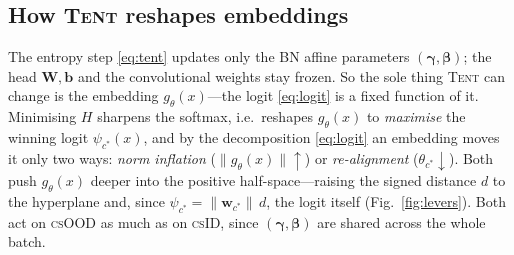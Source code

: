 \documentclass[11pt]{article}
\newcommand{\csid}{\textsc{cs}ID}
\newcommand{\csood}{\textsc{cs}OOD}
\newcommand{\g}{g_\theta}
\newcommand{\norm}[1]{\lVert #1 \rVert}
\newcommand{\method}[1]{\textsc{#1}}
\begin{document}
\subsection{How \method{Tent} reshapes embeddings}\label{sec:predict}

The entropy step \eqref{eq:tent} updates only the BN affine parameters
$(\bm{\gamma},\bm{\beta})$; the head $\mathbf{W},\mathbf{b}$ and the
convolutional weights stay frozen. So the sole thing \method{Tent} can
change is the embedding $\g(x)$---the logit \eqref{eq:logit} is a fixed
function of it. Minimising $H$ sharpens the softmax, i.e.\ reshapes
$\g(x)$ to \emph{maximise} the winning logit $\psi_{c^*}(x)$, and by the
decomposition \eqref{eq:logit} an embedding moves it only two ways:
\emph{norm inflation} ($\norm{\g(x)}\!\uparrow$) or \emph{re-alignment}
($\theta_{c^*}\!\downarrow$). Both push $\g(x)$ deeper into the positive
half-space---raising the signed distance $d$ to the hyperplane and, since
$\psi_{c^*}=\norm{\mathbf{w}_{c^*}}\,d$, the logit itself
(Fig.~\ref{fig:levers}). Both act on \csood{} as much as on \csid,
since $(\bm{\gamma},\bm{\beta})$ are shared across the whole batch.
\end{document}
